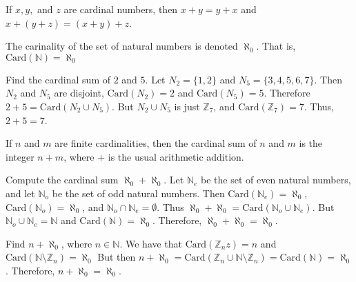         \begin{theorem}
            If $x,y,$ and $z$ are cardinal numbers, then
            $x+y=y+x$ and $x+(y+z)=(x+y)+z$.
        \end{theorem}
        The carinality of the set of natural numbers
        is denoted $\aleph_{0}$. That is,
        $\mathrm{Card}(\mathbb{N})=\aleph_{0}$
        \begin{example}
            Find the cardinal sum of $2$ and $5$. Let
            $N_{2}=\{1,2\}$ and $N_{5}=\{3,4,5,6,7\}$.
            Then $N_{2}$ and $N_{5}$ are disjoint,
            $\mathrm{Card}(N_{2})=2$ and $\mathrm{Card}(N_{5})=5$.
            Therefore $2+5=\mathrm{Card}(N_{2}\cup{N_{5}})$.
            But ${N_{2}}\cup{N_{5}}$ is just $\mathbb{Z}_{7}$,
            and $\mathrm{Card}(\mathbb{Z}_{7})=7$. Thus, $2+5=7$.
        \end{example}
        \begin{theorem}
            If $n$ and $m$ are finite cardinalities,
            then the cardinal sum of $n$ and $m$ is the
            integer $n+m$, where $+$ is the usual
            arithmetic addition.
        \end{theorem}
        \begin{example}
            Compute the cardinal sum
            $\aleph_{0}+\aleph_{0}$. Let
            $\mathbb{N}_{e}$ be the set of even natural
            numbers, and let $\mathbb{N}_{o}$ be the set
            of odd natural numbers. Then
            $\mathrm{Card}(\mathbb{N}_{e})=\aleph_{0}$,
            $\mathrm{Card}(\mathbb{N}_{o})=\aleph_{0}$, and
            ${\mathbb{N}_{o}}\cap{\mathbb{N}_{e}}=\emptyset$.
            Thus
            $\aleph_{0}+\aleph_{0}%
             =\mathrm{Card}({\mathbb{N}_{o}}\cup{\mathbb{N}_{e}})$.
            But
            ${\mathbb{N}_{o}}\cup{\mathbb{N}_{e}}%
             =\mathbb{N}$ and $\mathrm{Card}(\mathbb{N})=\aleph_{0}$.
            Therefore, $\aleph_{0}+\aleph_{0}=\aleph_{0}$.
        \end{example}
        \begin{example}
            Find $n+\aleph_{0}$, where $n\in\mathbb{N}$.
            We have that
            $\mathrm{Card}(\mathbb{Z}_{n}z)=n$ and
            $\mathrm{Card}(\mathbb{N}\setminus\mathbb{Z}_{n})%
             =\aleph_{0}$
            But then
            $n+\aleph_{0}=%
             \mathrm{Card}(\mathbb{Z}_{n}\cup%
             \mathbb{N}\setminus\mathbb{Z}_{n})%
             =\mathrm{Card}(\mathbb{N})=\aleph_{0}$.
            Therefore, $n+\aleph_{0}=\aleph_{0}$.
        \end{example}
